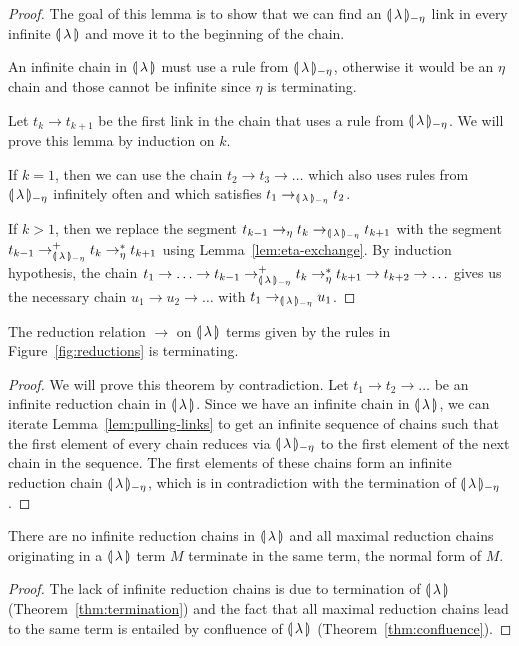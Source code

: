 \begin{proof}
  The goal of this lemma is to show that we can find an ${\llparenthesis \, \lambda \, \rrparenthesis_{-\eta}}$ link in
  every infinite ${\llparenthesis \, \lambda \, \rrparenthesis}$ and move it to the beginning of the chain.

  An infinite chain in ${\llparenthesis \, \lambda \, \rrparenthesis}$ must use a rule from ${\llparenthesis \, \lambda \, \rrparenthesis_{-\eta}}$, otherwise
  it would be an $\eta$ chain and those cannot be infinite since $\eta$ is
  terminating.
  
  Let $t_k \to t_{k+1}$ be the first link in the chain that uses a rule
  from ${\llparenthesis \, \lambda \, \rrparenthesis_{-\eta}}$. We will prove this lemma by induction on $k$.
  
  If $k = 1$, then we can use the chain $t_2 \to t_3 \to \ldots$ which also
  uses rules from ${\llparenthesis \, \lambda \, \rrparenthesis_{-\eta}}$ infinitely often and which satisfies
  $t_1 \to_{\llparenthesis \, \lambda \, \rrparenthesis_{-\eta}} t_2$.
  
  If $k > 1$, then we replace the segment
  $t_{k-1} \to_\eta t_k \to_{\llparenthesis \, \lambda \, \rrparenthesis_{-\eta}} t_{k+1}$ with the segment
  $t_{k-1} \to^+_{\llparenthesis \, \lambda \, \rrparenthesis_{-\eta}} t_k \to^*_\eta t_{k+1}$ using
  Lemma~\ref{lem:eta-exchange}. By induction hypothesis, the chain
  $t_1 \to \ldots \to t_{k-1} \to^+_{\llparenthesis \, \lambda \, \rrparenthesis_{-\eta}} t_k \to^*_\eta t_{k+1} \to
  t_{k+2} \to \ldots$ gives us the necessary chain $u_1 \to u_2 \to \ldots$
  with $t_1 \to_{\llparenthesis \, \lambda \, \rrparenthesis_{-\eta}} u_1$.
\end{proof}

\begin{theorem}\label{thm:termination}
  
  The reduction relation $\to$ on $\llparenthesis \, \lambda \, \rrparenthesis$ terms given by the
  rules in Figure~\ref{fig:reductions} is terminating.
\end{theorem}

\begin{proof}
  We will prove this theorem by contradiction. Let $t_1 \to t_2 \to \ldots$
  be an infinite reduction chain in ${\llparenthesis \, \lambda \, \rrparenthesis}$. Since we have an infinite
  chain in ${\llparenthesis \, \lambda \, \rrparenthesis}$, we can iterate Lemma~\ref{lem:pulling-links} to get an
  infinite sequence of chains such that the first element of every chain
  reduces via ${\llparenthesis \, \lambda \, \rrparenthesis_{-\eta}}$ to the first element of the next chain in the
  sequence. The first elements of these chains form an infinite reduction
  chain ${\llparenthesis \, \lambda \, \rrparenthesis_{-\eta}}$, which is in contradiction with the termination of
  ${\llparenthesis \, \lambda \, \rrparenthesis_{-\eta}}$.
\end{proof}

\begin{theorem}\label{thm:strong-normalization}
  
  There are no infinite reduction chains in ${\llparenthesis \, \lambda \, \rrparenthesis}$ and all maximal
  reduction chains originating in a ${\llparenthesis \, \lambda \, \rrparenthesis}$ term $M$ terminate in the same
  term, the normal form of $M$.
\end{theorem}

\begin{proof}
  The lack of infinite reduction chains is due to termination of ${\llparenthesis \, \lambda \, \rrparenthesis}$
  (Theorem~\ref{thm:termination}) and the fact that all maximal reduction
  chains lead to the same term is entailed by confluence of ${\llparenthesis \, \lambda \, \rrparenthesis}$
  (Theorem~\ref{thm:confluence}).
\end{proof}
